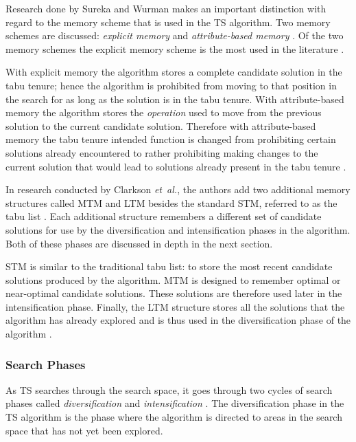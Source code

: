 Research done by Sureka and  Wurman makes an important distinction with regard to the memory scheme that is used in the \gls{TS} algorithm. Two memory schemes are discussed: \emph{explicit memory} and \emph{attribute-based memory} \cite{TabuBiddingStrats,TabuFormGames}. Of the two memory schemes the explicit memory scheme is the most used in the literature \cite{TabuVechicleRoutingWithTimeWindows}.

With explicit memory the algorithm stores a complete candidate solution in the tabu tenure; hence the algorithm is prohibited from moving to that position in the search for as long as the solution is in the tabu tenure\cite{TabuBiddingStrats,TabuFormGames}. With attribute-based memory the algorithm stores the \emph{operation} used to move from the previous solution to the current candidate solution\cite{TabuBiddingStrats,TabuFormGames}. Therefore with attribute-based memory the tabu tenure intended function is changed from prohibiting certain solutions already encountered to rather prohibiting making changes to the current solution that would lead to solutions already present in the tabu tenure \cite{TabuBiddingStrats,TabuFormGames}.

In research conducted by Clarkson \emph{et\ al.}\cite{MultiObjTabu}, the authors add two additional memory structures called \gls{MTM} and \gls{LTM} besides the standard \gls{STM}, referred to as the tabu list \cite{MultiObjTabu}. Each additional structure remembers a different set of candidate solutions for use by the diversification and intensification phases in the algorithm. Both of these phases are discussed in depth in the next section.

STM is similar to the traditional tabu list: to store the most recent candidate solutions produced by the algorithm. \gls{MTM} is designed to remember optimal or near-optimal candidate solutions. These solutions are therefore used later in the intensification phase. Finally, the \gls{LTM} structure stores all the solutions that the algorithm has already explored and is thus used in the diversification phase of the algorithm \cite{MultiObjTabu}.

\subsubsection{Search Phases}
\label{TSSearchPhases}
As \gls{TS} searches through the search space, it goes through two cycles of search phases called \emph{diversification} and \emph{intensification} \cite{TabuParameterization,TabuCrewSchedulingProblem,NonlinearGlobalTabu,SelfControllingReactiveTabu}. The diversification phase in the \gls{TS} algorithm is the phase where the algorithm is directed to areas in the search space that has not yet been explored\cite{ReactiveTabuVHR,SelfControllingReactiveTabu}.

